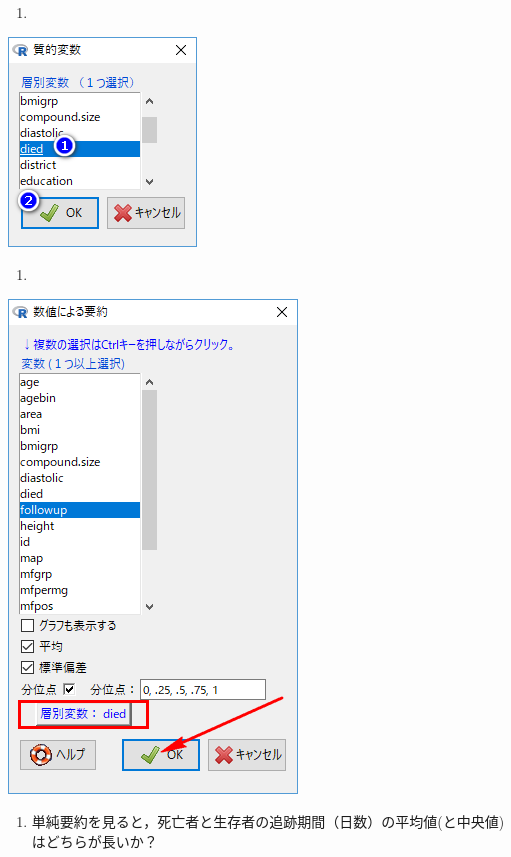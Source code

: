 \documentclass[11pt,]{problemset}
\providecommand{\tightlist}{%
  \setlength{\itemsep}{0pt}\setlength{\parskip}{0pt}}
\begin{document}
\newpage

\begin{enumerate}
\def\labelenumi{\arabic{enumi}.}
\setcounter{enumi}{4}
\item
\end{enumerate}

\begin{center}\includegraphics[width=0.25\linewidth,height=0.35\textheight]{pic/survival04} \end{center}

\begin{enumerate}
\def\labelenumi{\arabic{enumi}.}
\setcounter{enumi}{5}
\item
\end{enumerate}

\begin{center}\includegraphics[width=0.45\linewidth,height=0.35\textheight]{pic/survival05} \end{center}

\begin{enumerate}
\def\labelenumi{\arabic{enumi}.}
\setcounter{enumi}{6}
\tightlist
\item
  単純要約を見ると，死亡者と生存者の追跡期間（日数）の平均値(と中央値)はどちらが長いか？
\end{enumerate}
\end{document}
